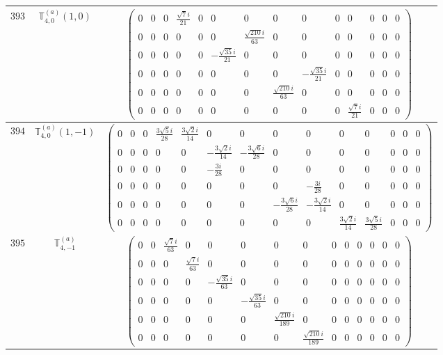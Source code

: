 \documentclass[fleqn,8pt,landscape]{jsarticle}
\begin{document}
\begin{center}
\begin{longtable}{ccc}
$ 393 $ & $ \mathbb{T}_{4,0}^{(a)}(1,0) $ & $ \begin{pmatrix} 0 & 0 & 0 & \frac{\sqrt{7} i}{21} & 0 & 0 & 0 & 0 & 0 & 0 & 0 & 0 & 0 & 0 \\ 0 & 0 & 0 & 0 & 0 & 0 & \frac{\sqrt{210} i}{63} & 0 & 0 & 0 & 0 & 0 & 0 & 0 \\ 0 & 0 & 0 & 0 & 0 & - \frac{\sqrt{35} i}{21} & 0 & 0 & 0 & 0 & 0 & 0 & 0 & 0 \\ 0 & 0 & 0 & 0 & 0 & 0 & 0 & 0 & - \frac{\sqrt{35} i}{21} & 0 & 0 & 0 & 0 & 0 \\ 0 & 0 & 0 & 0 & 0 & 0 & 0 & \frac{\sqrt{210} i}{63} & 0 & 0 & 0 & 0 & 0 & 0 \\ 0 & 0 & 0 & 0 & 0 & 0 & 0 & 0 & 0 & 0 & \frac{\sqrt{7} i}{21} & 0 & 0 & 0 \end{pmatrix} $ \\ \hline
$ 394 $ & $ \mathbb{T}_{4,0}^{(a)}(1,-1) $ & $ \begin{pmatrix} 0 & 0 & 0 & \frac{3 \sqrt{5} i}{28} & \frac{3 \sqrt{2} i}{14} & 0 & 0 & 0 & 0 & 0 & 0 & 0 & 0 & 0 \\ 0 & 0 & 0 & 0 & 0 & - \frac{3 \sqrt{2} i}{14} & - \frac{3 \sqrt{6} i}{28} & 0 & 0 & 0 & 0 & 0 & 0 & 0 \\ 0 & 0 & 0 & 0 & 0 & - \frac{3 i}{28} & 0 & 0 & 0 & 0 & 0 & 0 & 0 & 0 \\ 0 & 0 & 0 & 0 & 0 & 0 & 0 & 0 & - \frac{3 i}{28} & 0 & 0 & 0 & 0 & 0 \\ 0 & 0 & 0 & 0 & 0 & 0 & 0 & - \frac{3 \sqrt{6} i}{28} & - \frac{3 \sqrt{2} i}{14} & 0 & 0 & 0 & 0 & 0 \\ 0 & 0 & 0 & 0 & 0 & 0 & 0 & 0 & 0 & \frac{3 \sqrt{2} i}{14} & \frac{3 \sqrt{5} i}{28} & 0 & 0 & 0 \end{pmatrix} $ \\ \hline
$ 395 $ & $ \mathbb{T}_{4,-1}^{(a)} $ & $ \begin{pmatrix} 0 & 0 & \frac{\sqrt{7} i}{63} & 0 & 0 & 0 & 0 & 0 & 0 & 0 & 0 & 0 & 0 & 0 \\ 0 & 0 & 0 & \frac{\sqrt{7} i}{63} & 0 & 0 & 0 & 0 & 0 & 0 & 0 & 0 & 0 & 0 \\ 0 & 0 & 0 & 0 & - \frac{\sqrt{35} i}{63} & 0 & 0 & 0 & 0 & 0 & 0 & 0 & 0 & 0 \\ 0 & 0 & 0 & 0 & 0 & - \frac{\sqrt{35} i}{63} & 0 & 0 & 0 & 0 & 0 & 0 & 0 & 0 \\ 0 & 0 & 0 & 0 & 0 & 0 & \frac{\sqrt{210} i}{189} & 0 & 0 & 0 & 0 & 0 & 0 & 0 \\ 0 & 0 & 0 & 0 & 0 & 0 & 0 & \frac{\sqrt{210} i}{189} & 0 & 0 & 0 & 0 & 0 & 0 \end{pmatrix} $ \\ \hline

\end{longtable}
\end{center}
\end{document}
